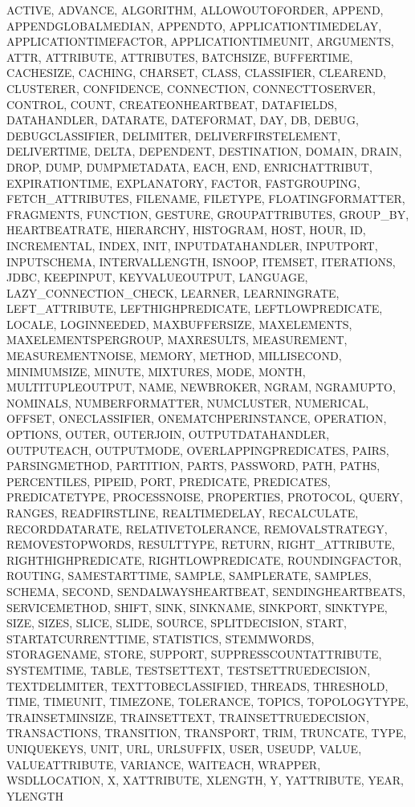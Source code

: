 {{ACTIVE, ADVANCE, ALGORITHM, ALLOWOUTOFORDER, APPEND, APPENDGLOBALMEDIAN, APPENDTO, APPLICATIONTIMEDELAY, APPLICATIONTIMEFACTOR, APPLICATIONTIMEUNIT, ARGUMENTS, ATTR, ATTRIBUTE, ATTRIBUTES, BATCHSIZE, BUFFERTIME, CACHESIZE, CACHING, CHARSET, CLASS, CLASSIFIER, CLEAREND, CLUSTERER, CONFIDENCE, CONNECTION, CONNECTTOSERVER, CONTROL, COUNT, CREATEONHEARTBEAT, DATAFIELDS, DATAHANDLER, DATARATE, DATEFORMAT, DAY, DB, DEBUG, DEBUGCLASSIFIER, DELIMITER, DELIVERFIRSTELEMENT, DELIVERTIME, DELTA, DEPENDENT, DESTINATION, DOMAIN, DRAIN, DROP, DUMP, DUMPMETADATA, EACH, END, ENRICHATTRIBUT, EXPIRATIONTIME, EXPLANATORY, FACTOR, FASTGROUPING, FETCH_ATTRIBUTES, FILENAME, FILETYPE, FLOATINGFORMATTER, FRAGMENTS, FUNCTION, GESTURE, GROUPATTRIBUTES, GROUP_BY, HEARTBEATRATE, HIERARCHY, HISTOGRAM, HOST, HOUR, ID, INCREMENTAL, INDEX, INIT, INPUTDATAHANDLER, INPUTPORT, INPUTSCHEMA, INTERVALLENGTH, ISNOOP, ITEMSET, ITERATIONS, JDBC, KEEPINPUT, KEYVALUEOUTPUT, LANGUAGE, LAZY_CONNECTION_CHECK, LEARNER, LEARNINGRATE, LEFT_ATTRIBUTE, LEFTHIGHPREDICATE, LEFTLOWPREDICATE, LOCALE, LOGINNEEDED, MAXBUFFERSIZE, MAXELEMENTS, MAXELEMENTSPERGROUP, MAXRESULTS, MEASUREMENT, MEASUREMENTNOISE, MEMORY, METHOD, MILLISECOND, MINIMUMSIZE, MINUTE, MIXTURES, MODE, MONTH, MULTITUPLEOUTPUT, NAME, NEWBROKER, NGRAM, NGRAMUPTO, NOMINALS, NUMBERFORMATTER, NUMCLUSTER, NUMERICAL, OFFSET, ONECLASSIFIER, ONEMATCHPERINSTANCE, OPERATION, OPTIONS, OUTER, OUTERJOIN, OUTPUTDATAHANDLER, OUTPUTEACH, OUTPUTMODE, OVERLAPPINGPREDICATES, PAIRS, PARSINGMETHOD, PARTITION, PARTS, PASSWORD, PATH, PATHS, PERCENTILES, PIPEID, PORT, PREDICATE, PREDICATES, PREDICATETYPE, PROCESSNOISE, PROPERTIES, PROTOCOL, QUERY, RANGES, READFIRSTLINE, REALTIMEDELAY, RECALCULATE, RECORDDATARATE, RELATIVETOLERANCE, REMOVALSTRATEGY, REMOVESTOPWORDS, RESULTTYPE, RETURN, RIGHT_ATTRIBUTE, RIGHTHIGHPREDICATE, RIGHTLOWPREDICATE, ROUNDINGFACTOR, ROUTING, SAMESTARTTIME, SAMPLE, SAMPLERATE, SAMPLES, SCHEMA, SECOND, SENDALWAYSHEARTBEAT, SENDINGHEARTBEATS, SERVICEMETHOD, SHIFT, SINK, SINKNAME, SINKPORT, SINKTYPE, SIZE, SIZES, SLICE, SLIDE, SOURCE, SPLITDECISION, START, STARTATCURRENTTIME, STATISTICS, STEMMWORDS, STORAGENAME, STORE, SUPPORT, SUPPRESSCOUNTATTRIBUTE, SYSTEMTIME, TABLE, TESTSETTEXT, TESTSETTRUEDECISION, TEXTDELIMITER, TEXTTOBECLASSIFIED, THREADS, THRESHOLD, TIME, TIMEUNIT, TIMEZONE, TOLERANCE, TOPICS, TOPOLOGYTYPE, TRAINSETMINSIZE, TRAINSETTEXT, TRAINSETTRUEDECISION, TRANSACTIONS, TRANSITION, TRANSPORT, TRIM, TRUNCATE, TYPE, UNIQUEKEYS, UNIT, URL, URLSUFFIX, USER, USEUDP, VALUE, VALUEATTRIBUTE, VARIANCE, WAITEACH, WRAPPER, WSDLLOCATION, X, XATTRIBUTE, XLENGTH, Y, YATTRIBUTE, YEAR, YLENGTH%
}}
